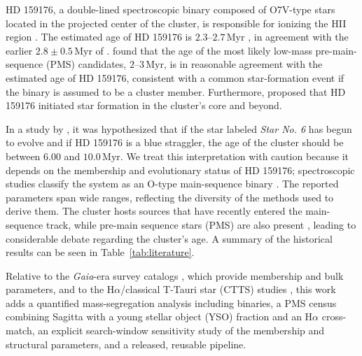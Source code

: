 \documentclass{aa}
\begin{document}
HD 159176, a double-lined spectroscopic binary composed of O7V-type stars located in the projected center of the cluster, is responsible for ionizing the HII region \citep{2016ApJ...832..211P}. The estimated age of HD 159176 is $2.3$--$2.7\,\mathrm{Myr}$ \citep{2010AA...511A..25R}, in agreement with the earlier $2.8\pm0.5\,\mathrm{Myr}$ of \citet{1978MNRAS.182..607F}\@. \citet{2010AA...511A..25R} found that the age of the most likely low-mass pre-main-sequence (PMS) candidates, $2$--$3\,\mathrm{Myr}$, is in reasonable agreement with the estimated age of HD 159176, consistent with a common star-formation event if the binary is assumed to be a cluster member. Furthermore, \citet{1978MNRAS.182..607F} proposed that HD 159176 initiated star formation in the cluster's core and beyond.

In a study by \citet{2018AA...610A..30A}, it was hypothesized that if the star labeled \textit{Star No. 6} has begun to evolve and if HD 159176 is a blue straggler, the age of the cluster should be between $6.00$ and $10.0\,\mathrm{Myr}$. We treat this interpretation with caution because it depends on the membership and evolutionary status of HD 159176; spectroscopic studies classify the system as an O-type main-sequence binary \citep{1993Obs...113..204S,2007A&A...474..193L,2016ApJ...832..211P}. The reported parameters span wide ranges, reflecting the diversity of the methods used to derive them. The cluster hosts sources that have recently entered the main-sequence track, while pre-main sequence stars (PMS) are also present \citep{2019MNRAS.484.5102K}, leading to considerable debate regarding the cluster's age. A summary of the historical results can be seen in Table~\ref{tab:literature}.

Relative to the \textit{Gaia}-era survey catalogs \citep{2020AA...640A...1C,2022ApJS..262....7H,2024arXiv240305143H}, which provide membership and bulk parameters, and to the H$\alpha$/classical T-Tauri star (CTTS) studies \citep{2010AA...511A..25R,2019MNRAS.484.5102K}, this work adds a quantified mass-segregation analysis including binaries, a PMS census combining Sagitta with a young stellar object (YSO) fraction and an H$\alpha$ cross-match, an explicit search-window sensitivity study of the membership and structural parameters, and a released, reusable pipeline.
\end{document}
